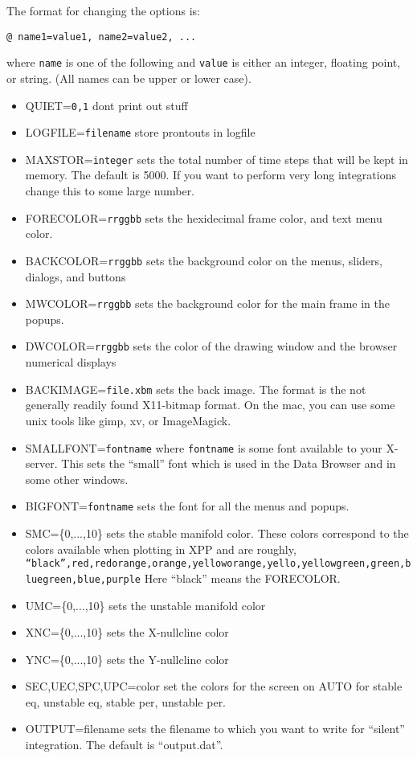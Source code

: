 The format for changing the options is:
\begin{verbatim}
@ name1=value1, name2=value2, ...
\end{verbatim}
where {\tt name} is one of the following and {\tt value} is either an
integer, floating point, or string.  (All names can be upper or lower
case). 
\begin{itemize}\itemsep -.05in
\item QUIET={\tt 0,1} dont print out stuff
\item LOGFILE={\tt filename} store prontouts in logfile
\item MAXSTOR={\tt integer} sets the total number of time steps that
will be kept in memory.  The default is 5000.  If you want to perform 
very long integrations change this to some large number.  
\item FORECOLOR={\tt rrggbb} sets the hexidecimal frame color, and text menu color.
\item BACKCOLOR={\tt rrggbb} sets the background color on the menus, sliders, dialogs, and buttons
\item MWCOLOR={\tt rrggbb}  sets the background color for the main frame in the popups.  
\item DWCOLOR={\tt rrggbb} sets the color of the drawing window and the browser numerical displays
\item BACKIMAGE={\tt file.xbm} sets the back image. The format is the not generally readily found X11-bitmap format. On the mac, you can use some unix tools like gimp, xv, or ImageMagick.  
\item SMALLFONT={\tt fontname} where {\tt fontname} is some font available
to your X-server.  This sets the ``small'' font which is used in the
Data Browser and in some other windows.  
\item BIGFONT={\tt fontname} sets the font for all the menus and popups.  
\item SMC=\{0,...,10\} sets the stable manifold color. These colors correspond to the colors available when plotting in XPP and are roughly, {\tt ``black'',red,redorange,orange,yelloworange,yello,yellowgreen,green,bluegreen,blue,purple} Here ``black'' means the FORECOLOR.
\item UMC=\{0,...,10\} sets the unstable manifold color
\item XNC=\{0,...,10\} sets the X-nullcline color
\item YNC=\{0,...,10\} sets the Y-nullcline color
\item SEC,UEC,SPC,UPC=color set the colors for the screen on AUTO for stable eq, unstable eq, stable per, unstable per.
\item OUTPUT=filename sets the filename to which you want to write for
``silent'' integration.  The default is ``output.dat''. 


\end{itemize}
